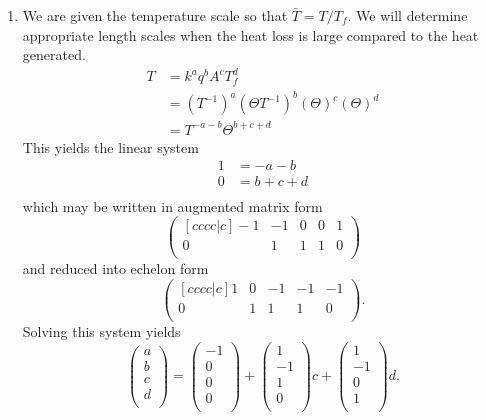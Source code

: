 \documentclass[12pt]{article}
\begin{document}
\begin{enumerate}
\item
  We are given the temperature scale so that $\bar{T}=T/T_f$. We will determine
  appropriate length scales when the heat loss is large compared to the heat
  generated.
  \begin{equation*}
    \begin{aligned}
      T &= k^aq^bA^cT_f^d \\
      &= (T^{-1})^a(\Theta T^{-1})^b(\Theta)^c(\Theta)^d \\
      &= T^{-a-b}\Theta^{b+c+d}
    \end{aligned}
  \end{equation*}
  This yields the linear system
  \begin{equation*}
    \begin{aligned}
      1 &= -a - b \\
      0 &= b + c + d \\
    \end{aligned}
  \end{equation*}
  which may be written in augmented matrix form
  \begin{equation*}
    \begin{pmatrix}[cccc|c]
      -1 & -1 & 0 & 0 & 1 \\
      0 & 1 & 1 & 1 & 0 \\
    \end{pmatrix}
  \end{equation*}
  and reduced into echelon form
  \begin{equation*}
    \begin{pmatrix}[cccc|c]
      1 & 0 & -1 & -1 & -1 \\
      0 & 1 & 1 & 1 & 0 \\
    \end{pmatrix}.
  \end{equation*}
  Solving this system yields
  \begin{equation*}
    \begin{pmatrix}
      a \\ b \\ c \\ d \\
    \end{pmatrix} =
    \begin{pmatrix}
      -1 \\ 0 \\ 0 \\ 0 \\
    \end{pmatrix} +
    \begin{pmatrix}
      1 \\ -1 \\ 1 \\ 0 \\
    \end{pmatrix}c +
    \begin{pmatrix}
      1 \\ -1 \\ 0 \\ 1 \\
    \end{pmatrix}d.
  \end{equation*}


\end{enumerate}
\end{document}
